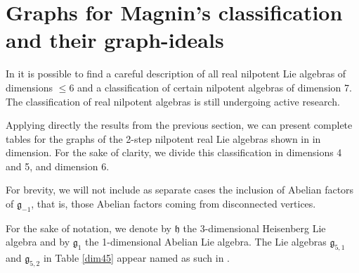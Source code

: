 \documentclass[12pt]{amsart}
\begin{document}
\section{Graphs for Magnin's classification and their graph-ideals}\label{sec:magnin}

In \cite{magnin} it is possible to find a careful description of all real nilpotent Lie algebras of dimensions $\leq6$ and a classification of certain nilpotent algebras of dimension 7. The classification of real nilpotent algebras is still undergoing active research.

Applying directly the results from the previous section, we can present complete tables for the graphs of the 2-step nilpotent real Lie algebras shown in \cite{magnin} in dimension. For the sake of clarity, we divide this classification in dimensions 4 and 5, and dimension 6.

For brevity, we will not include as separate cases the inclusion of Abelian factors of ${\mathfrak g}_{-1}$, that is, those Abelian factors coming from disconnected vertices.

For the sake of notation, we denote by $\mathfrak h$ the 3-dimensional Heisenberg Lie algebra and by ${\mathfrak g}_1$ the 1-dimensional Abelian Lie algebra. The Lie algebras $\mathfrak{g}_{5,1}$ and $\mathfrak{g}_{5,2}$ in Table \ref{dim45} appear named as such in \cite{magnin}. 
\end{document}
